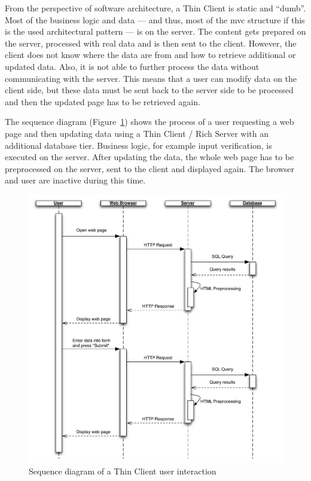 From the perspective of software architecture, a Thin Client is static and ``dumb''. Most of the business logic and data --- and thus, most of the \ac{mvc} structure if this is the used architectural pattern --- is on the server. The content gets prepared on the server, processed with real data and is then sent to the client. However, the client does not know where the data are from and how to retrieve additional or updated data. Also, it is not able to further process the data without communicating with the server. This means that a user can modify data on the client side, but these data must be sent back to the server side to be processed and then the updated page has to be retrieved again.

The sequence diagram (Figure~\ref{fig:seqthinclient}) shows the process of a user requesting a web page and then updating data using a Thin Client / Rich Server with an additional database tier. Business logic, for example input verification, is executed on the server. After updating the data, the whole web page has to be preprocessed on the server, sent to the client and displayed again. The browser and user are inactive during this time.

\begin{figure}[H]
	\centering
	\includegraphics[width=16cm]{images/seqthinclient.pdf}
	\caption{Sequence diagram of a Thin Client user interaction}
	\label{fig:seqthinclient}
\end{figure}

